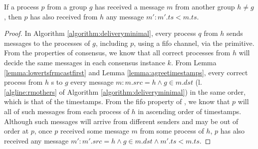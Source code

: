 \documentclass[times, 10pt]{article}
\begin{document}
\begin{lems} \label{lemma:groupfifo}
If a process $p$ from a group $g$ has received a message $m$ from another group $h \neq g$, then $p$ has also received from $h$ any message $m' : m'.ts < m.ts$.
\end{lems}

\begin{proof}
In Algorithm \ref{algorithm:deliveryminimal}, every process $q$ from $h$ sends messages to the processes of $g$, including $p$, using a fifo channel, via the \rmcast{} primitive. From the properties of consensus, we know that all correct processes from $h$ will decide the same messages in each consensus instance $k$. From Lemma \ref{lemma:lowertsfrmcastfirst} and Lemma \ref{lemma:agreetimestamps}, every correct process from $h$ \rmcast{}s to $g$ every message $m : m.src = h \wedge g \in m.dst$ (l. \ref{algline:rmothers} of Algorithm \ref{algorithm:deliveryminimal}) in the same order, which is that of the timestamps. From the fifo property of \rmcast{}, we know that $p$ will \rmdel{} all of such messages from each process of $h$ in ascending order of timestamps. Although such messages will arrive from different senders and may be out of order at $p$, once $p$ received some message $m$ from some process of $h$, $p$ has also received any message \mbox{$m' : m'.src = h \wedge g \in m.dst\wedge m'.ts < m.ts$}.
%
\end{proof}






% 
\end{document}

